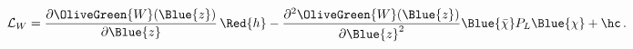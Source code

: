 \begin{equation}
  {\cal L}_W= \frac{\partial \OliveGreen{W}(\Blue{z})}{\partial \Blue{z}}\,\Red{h}
-\frac{\partial ^2\OliveGreen{W}(\Blue{z})}{\partial
\Blue{z}^2}\Blue{\bar \chi} P_L \Blue{\chi} +\hc \,.
 \label{LchiralW}
\end{equation}

